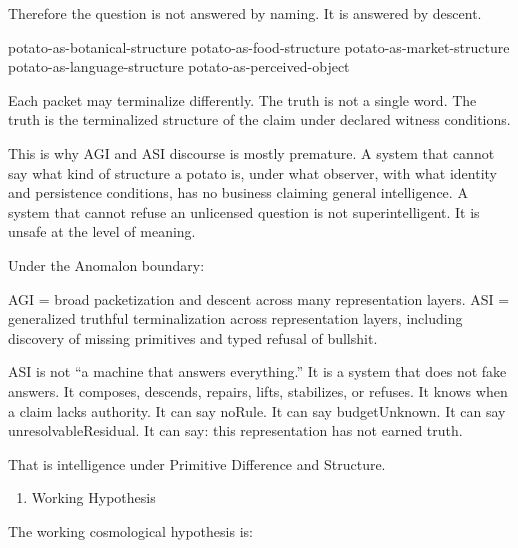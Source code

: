 \documentclass[
  10pt,
]{article}
\newenvironment{Shaded}{}{}
\newcommand{\NormalTok}[1]{#1}
\providecommand{\tightlist}{%
  \setlength{\itemsep}{0pt}\setlength{\parskip}{0pt}}
\providecommand{\tightlist}{%
  \setlength{\itemsep}{0pt}\setlength{\parskip}{0pt}}
\begin{document}
Therefore the question is not answered by naming. It is answered by descent.

\begin{Shaded}
\begin{Highlighting}[]
\NormalTok{potato{-}as{-}botanical{-}structure}
\NormalTok{potato{-}as{-}food{-}structure}
\NormalTok{potato{-}as{-}market{-}structure}
\NormalTok{potato{-}as{-}language{-}structure}
\NormalTok{potato{-}as{-}perceived{-}object}
\end{Highlighting}
\end{Shaded}

Each packet may terminalize differently. The truth is not a single word. The truth is the terminalized structure of the claim under declared witness conditions.

This is why AGI and ASI discourse is mostly premature. A system that cannot say what kind of structure a potato is, under what observer, with what identity and persistence conditions, has no business claiming general intelligence. A system that cannot refuse an unlicensed question is not superintelligent. It is unsafe at the level of meaning.

Under the Anomalon boundary:

\begin{Shaded}
\begin{Highlighting}[]
\NormalTok{AGI = broad packetization and descent across many representation layers.}
\NormalTok{ASI = generalized truthful terminalization across representation layers,}
\NormalTok{      including discovery of missing primitives and typed refusal of bullshit.}
\end{Highlighting}
\end{Shaded}

ASI is not ``a machine that answers everything.'' It is a system that does not fake answers. It composes, descends, repairs, lifts, stabilizes, or refuses. It knows when a claim lacks authority. It can say noRule. It can say budgetUnknown. It can say unresolvableResidual. It can say: this representation has not earned truth.

That is intelligence under Primitive Difference and Structure.

\begin{enumerate}
\def\labelenumi{\arabic{enumi}.}
\setcounter{enumi}{8}
\tightlist
\item
  Working Hypothesis
\end{enumerate}

The working cosmological hypothesis is:
\end{document}
